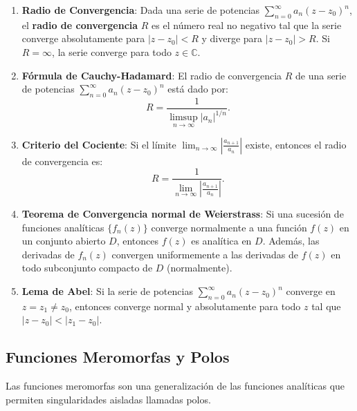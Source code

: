 \documentclass[main.tex]{subfiles}
\begin{document}
\begin{enumerate}

\item \textbf{Radio de Convergencia}:
Dada una serie de potencias \(\sum_{n=0}^\infty a_n (z - z_0)^n\), el \textbf{radio de convergencia} \(R\) es el número real no negativo tal que la serie converge absolutamente para \(|z - z_0| < R\) y diverge para \(|z - z_0| > R\). Si \(R = \infty\), la serie converge para todo \(z \in \mathbb{C}\).

\item \textbf{Fórmula de Cauchy-Hadamard}:
El radio de convergencia \(R\) de una serie de potencias \(\sum_{n=0}^\infty a_n (z - z_0)^n\) está dado por:
\[
R = \frac{1}{\limsup_{n \to \infty} |a_n|^{1/n}}.
\]

\item \textbf{Criterio del Cociente}:
Si el límite \(\lim_{n \to \infty} \left| \frac{a_{n+1}}{a_n} \right|\) existe, entonces el radio de convergencia es:
\[
R = \frac{1}{\lim_{n \to \infty} \left| \frac{a_{n+1}}{a_n} \right|}.
\]

\item \textbf{Teorema de Convergencia normal de Weierstrass}:
Si una sucesión de funciones analíticas \(\{f_n(z)\}\) converge normalmente a una función \(f(z)\) en un conjunto abierto \(D\), entonces \(f(z)\) es analítica en \(D\). Además, las derivadas de \(f_n(z)\) convergen uniformemente a las derivadas de \(f(z)\) en todo subconjunto compacto de \(D\) (normalmente).

\item \textbf{Lema de Abel}:
Si la serie de potencias \(\sum_{n=0}^\infty a_n (z - z_0)^n\) converge en \(z = z_1 \neq z_0\), entonces converge normal y absolutamente para todo \(z\) tal que \(|z - z_0| < |z_1 - z_0|\).

\end{enumerate}
\subsection{Funciones Meromorfas y Polos}

\noindent Las funciones meromorfas son una generalización de las funciones analíticas que permiten singularidades aisladas llamadas polos.
\end{document}
